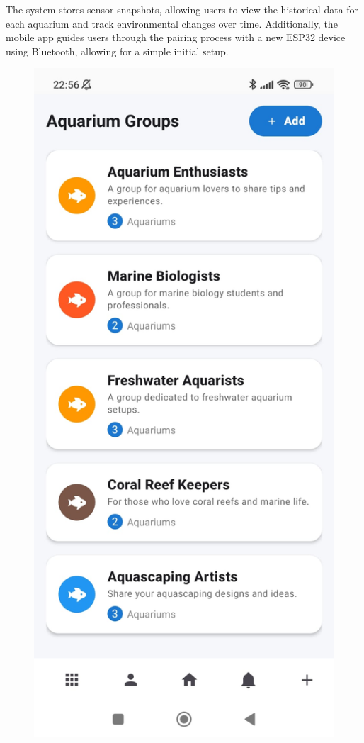 \documentclass[11pt,a4paper]{article}
\begin{document}
\vspace{2em}
The system stores sensor snapshots, allowing users to view the historical data for each aquarium and track environmental changes over time. Additionally, the mobile app guides users through the pairing process with a new ESP32 device using Bluetooth, allowing for a simple initial setup.

\begin{figure}[H]
    \centering
    \begin{minipage}{0.35\textwidth}
        \centering
        \includegraphics[width=\linewidth]{Images/List groups.jpeg}

\end{minipage}
\end{figure}
\end{document}
